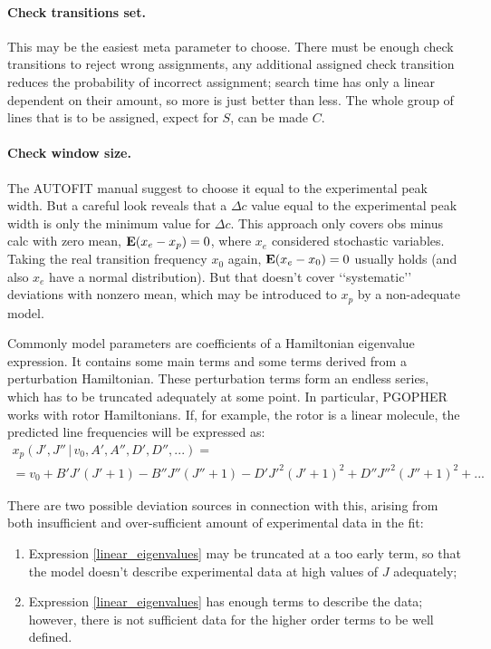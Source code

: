 \documentclass[11pt]{article}
\begin{document}
\paragraph{Check transitions set.}

This may be the easiest meta  parameter to choose. There must be enough check transitions to reject wrong assignments, any additional assigned check transition reduces the probability of incorrect assignment; search time has only a linear dependent on their amount, so more is just better than less. The whole group of lines that is to be assigned, expect for $S$, can be made $C$.

\paragraph{Check window size.}

The AUTOFIT manual suggest to choose it equal to the experimental peak width. But a careful look reveals that a $\Delta c$ value equal to the experimental peak width is only the minimum value for $\Delta c$. This approach only covers obs minus calc  with zero mean, $\mathbf{E} (x_e - x_p) = 0$, where $x_e$ considered stochastic variables. Taking the real transition frequency $x_0$ again, $\mathbf{E} (x_e - x_0) = 0$ usually holds (and also $x_e$ have a normal distribution). But that doesn't cover \lq\lq{}systematic\rq\rq{} deviations with nonzero mean, which may be introduced to $x_p$ by a non-adequate model.

Commonly  model parameters are coefficients of a Hamiltonian eigenvalue expression. It contains some main terms and some terms derived from a perturbation Hamiltonian. These perturbation terms form an endless series, which has to be truncated adequately at some point. In particular, PGOPHER works with rotor Hamiltonians. If, for example, the rotor is a linear molecule, the predicted line frequencies will be expressed as:
\begin{multline}
\label{linear_eigenvalues}
x_p(J', J''\, |\, v_0, A', A'', D', D'', ...) = \\
= v_0 + B'J'(J'+1) - B''J''(J''+1) - D'{J'}^2(J'+1)^2 + D''{J''}^2(J''+1)^2 + ... 
\end{multline}

There are two possible deviation sources in connection with this, arising from both insufficient and over-sufficient amount of experimental data in the fit:
\begin{enumerate}
	\item Expression \ref{linear_eigenvalues} may be truncated at a too early term, so that the model doesn't describe experimental data at high values of $J$ adequately;
	\item Expression \ref{linear_eigenvalues} has enough terms to describe the data; however, there is not sufficient data for the higher order terms to be well defined. 
\end{enumerate}
\end{document}
